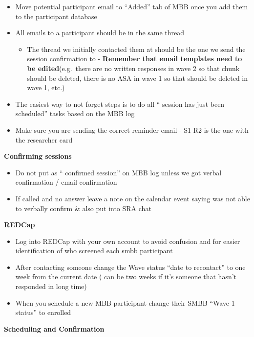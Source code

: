 \documentclass[]{book}
\providecommand{\tightlist}{%
  \setlength{\itemsep}{0pt}\setlength{\parskip}{0pt}}
\begin{document}
\begin{itemize}
\tightlist
\item
  Move potential participant email to ``Added'' tab of MBB once you add them to the participant database
\item
  All emails to a participant should be in the same thread

  \begin{itemize}
  \tightlist
  \item
    The thread we initially contacted them at should be the one we send the session confirmation to - \textbf{Remember that email templates need to be edited}(e.g.~there are no written responses in wave 2 so that chunk should be deleted, there is no ASA in wave 1 so that should be deleted in wave 1, etc.)
  \end{itemize}
\item
  The easiest way to not forget steps is to do all `` session has just been scheduled'' tasks based on the MBB log
\item
  Make sure you are sending the correct reminder email - S1 R2 is the one with the researcher card
\end{itemize}

\textbf{Confirming sessions}

\begin{itemize}
\tightlist
\item
  Do not put as `` confirmed session'' on MBB log unless we got verbal confirmation / email confirmation
\item
  If called and no answer leave a note on the calendar event saying was not able to verbally confirm \& also put into SRA chat
\end{itemize}

\textbf{REDCap}

\begin{itemize}
\tightlist
\item
  Log into REDCap with your own account to avoid confusion and for easier identification of who screened each smbb participant
\item
  After contacting someone change the Wave status ``date to recontact'' to one week from the current date ( can be two weeks if it's someone that hasn't responded in long time)
\item
  When you schedule a new MBB participant change their SMBB ``Wave 1 status'' to enrolled
\end{itemize}

\textbf{Scheduling and Confirmation}
\end{document}
